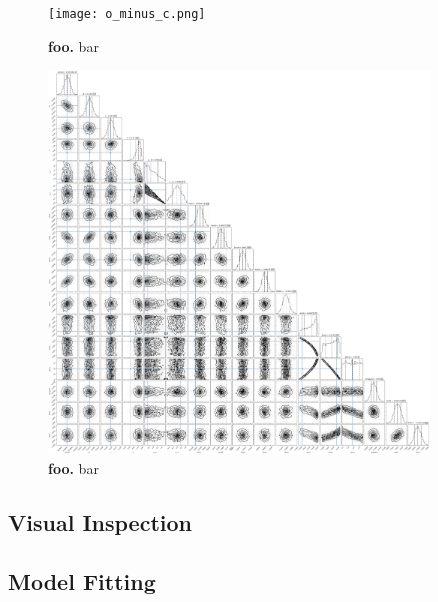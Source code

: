 \documentclass[12pt,twocolumn,tighten]{aastex62}
\begin{document}
\begin{figure}[t]
	\begin{center}
		\leavevmode
		\texttt{[image: o\_minus\_c.png]}
	\end{center}
	\vspace{-0.7cm}
	\caption{ {\bf foo.}
		bar
		\label{fig:o_minus_c}
	}
\end{figure}

\begin{figure}[t]
	\begin{center}
		\leavevmode
		\includegraphics[width=0.9\textwidth]{f5_comp.png}
	\end{center}
	\vspace{-0.7cm}
	\caption{ {\bf foo.}
    bar
		\label{fig:corner}
	}
\end{figure}


\subsection{Visual Inspection}

% 

\subsection{Model Fitting}
\end{document}
